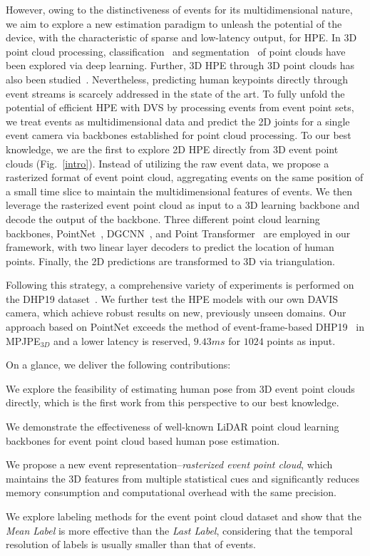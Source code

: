 \documentclass[10pt,twocolumn,letterpaper]{article}
\begin{document}
However, owing to the distinctiveness of events for its multidimensional nature, we aim to explore a new estimation paradigm to unleash the potential of the device, with the characteristic of sparse and low-latency output, for HPE.
In 3D point cloud processing, classification~\cite{qi2017pointnet, qi2017pointnet++} and segmentation~\cite{wang2019dgcnn, zhao2021pointtrans} of point clouds have been explored via deep learning.
Further, 3D HPE through 3D point clouds has also been studied~\cite{zhou2020learning3Dpoint, chan20143pointcloudsystem}.
Nevertheless, predicting human keypoints directly through event streams is scarcely addressed in the state of the art.
To fully unfold the potential of efficient HPE with DVS by processing events from event point sets, we treat events as multidimensional data and predict the 2D joints for a single event camera via backbones established for point cloud processing.
To our best knowledge, we are the first to explore 2D HPE directly from 3D event point clouds (Fig.~\ref{intro}).
Instead of utilizing the raw event data, we propose a rasterized format of event point cloud, aggregating events on the same position of a small time slice to maintain the multidimensional features of events.
We then leverage the rasterized event point cloud as input to a 3D learning backbone and decode the output of the backbone.
Three different point cloud learning backbones, PointNet~\cite{qi2017pointnet}, DGCNN~\cite{wang2019dgcnn}, and Point Transformer~\cite{zhao2021pointtrans} are employed in our framework, with two linear layer decoders to predict the location of human points. Finally, the 2D predictions are transformed to 3D via triangulation.

Following this strategy, a comprehensive variety of experiments is performed on the DHP19 dataset~\cite{calabrese2019dhp19}. We further test the HPE models with our own DAVIS camera, which achieve robust results on new, previously unseen domains. 
Our approach based on PointNet exceeds the method of event-frame-based DHP19~\cite{calabrese2019dhp19} in MPJPE$_{3D}$ and a lower latency is reserved, $9.43ms$ for $1024$ points as input.

On a glance, we deliver the following contributions:
\begin{compactitem}
  \item We explore the feasibility of estimating human pose from 3D event point clouds directly, which is the first work from this perspective to our best knowledge.
  \item We demonstrate the effectiveness of well-known LiDAR point cloud learning backbones for event point cloud based human pose estimation.
  \item We propose a new event representation--\emph{rasterized event point cloud}, which maintains the 3D features from multiple statistical cues and significantly reduces memory consumption and computational overhead with the same precision.
  \item We explore labeling methods for the event point cloud dataset and show that the \emph{Mean Label} is more effective than the \emph{Last Label}, considering that the temporal resolution of labels is usually smaller than that of events.
\end{compactitem}
\end{document}
